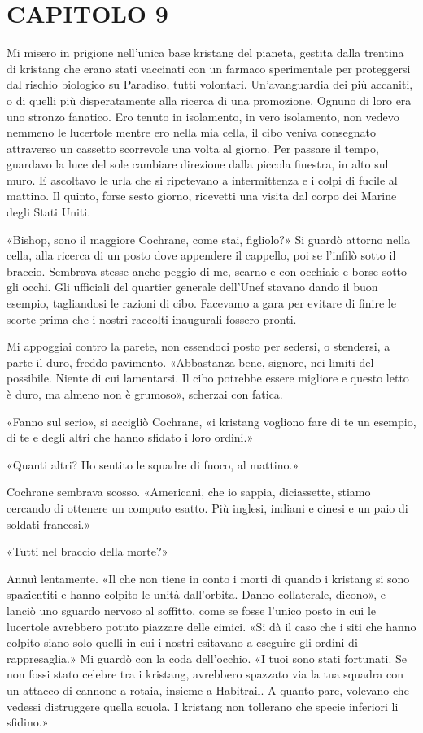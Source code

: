 \chapter{CAPITOLO 9}\label{capitolo-9}

\hfill\break

Mi misero in prigione nell'unica base kristang del pianeta, gestita
dalla trentina di kristang che erano stati vaccinati con un farmaco
sperimentale per proteggersi dal rischio biologico su Paradiso, tutti
volontari. Un'avanguardia dei più accaniti, o di quelli più
disperatamente alla ricerca di una promozione. Ognuno di loro era uno
stronzo fanatico. Ero tenuto in isolamento, in vero isolamento, non
vedevo nemmeno le lucertole mentre ero nella mia cella, il cibo veniva
consegnato attraverso un cassetto scorrevole una volta al giorno. Per
passare il tempo, guardavo la luce del sole cambiare direzione dalla
piccola finestra, in alto sul muro. E ascoltavo le urla che si
ripetevano a intermittenza e i colpi di fucile al mattino. Il quinto,
forse sesto giorno, ricevetti una visita dal corpo dei Marine degli
Stati Uniti.

«Bishop, sono il maggiore Cochrane, come stai, figliolo?» Si guardò
attorno nella cella, alla ricerca di un posto dove appendere il
cappello, poi se l'infilò sotto il braccio. Sembrava stesse anche peggio
di me, scarno e con occhiaie e borse sotto gli occhi. Gli ufficiali del
quartier generale dell'Unef stavano dando il buon esempio, tagliandosi
le razioni di cibo. Facevamo a gara per evitare di finire le scorte
prima che i nostri raccolti inaugurali fossero pronti.

Mi appoggiai contro la parete, non essendoci posto per sedersi, o
stendersi, a parte il duro, freddo pavimento. «Abbastanza bene, signore,
nei limiti del possibile. Niente di cui lamentarsi. Il cibo potrebbe
essere migliore e questo letto è duro, ma almeno non è grumoso»,
scherzai con fatica.

«Fanno sul serio», si accigliò Cochrane, «i kristang vogliono fare di te
un esempio, di te e degli altri che hanno sfidato i loro ordini.»

«Quanti altri? Ho sentito le squadre di fuoco, al mattino.»

Cochrane sembrava scosso. «Americani, che io sappia, diciassette, stiamo
cercando di ottenere un computo esatto. Più inglesi, indiani e cinesi e
un paio di soldati francesi.»

«Tutti nel braccio della morte?»

Annuì lentamente. «Il che non tiene in conto i morti di quando i
kristang si sono spazientiti e hanno colpito le unità dall'orbita. Danno
collaterale, dicono», e lanciò uno sguardo nervoso al soffitto, come se
fosse l'unico posto in cui le lucertole avrebbero potuto piazzare delle
cimici. «Si dà il caso che i siti che hanno colpito siano solo quelli in
cui i nostri esitavano a eseguire gli ordini di rappresaglia.» Mi guardò
con la coda dell'occhio. «I tuoi sono stati fortunati. Se non fossi
stato celebre tra i kristang, avrebbero spazzato via la tua squadra con
un attacco di cannone a rotaia, insieme a Habitrail. A quanto pare,
volevano che vedessi distruggere quella scuola. I kristang non tollerano
che specie inferiori li sfidino.»

